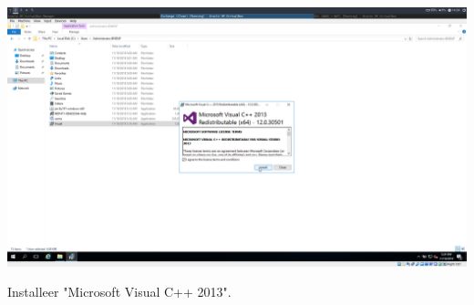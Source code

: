 \documentclass[a4paper]{article}
\begin{document}
\begin{center}
	\includegraphics[width=15cm]{Pictures/Exchange/Pre/1542633852.png}
	
	Installeer "Microsoft Visual C++ 2013".
\end{center}
\end{document}
